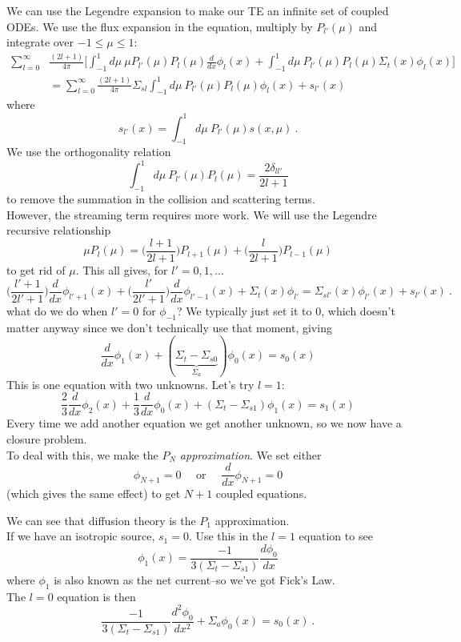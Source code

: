 \documentclass[12pt]{article}
\begin{document}
We can use the Legendre expansion to make our TE an infinite set of coupled ODEs. We use the flux expansion in the equation, multiply by $P_{l'}(\mu)$ and integrate over $-1 \leq \mu \leq 1$:
\begin{align*}
\sum_{l=0}^{\infty} &\frac{(2l+1)}{4\pi}\biggl[\int_{-1}^1 d\mu\: \mu P_{l'}(\mu) P_l(\mu) \frac{d}{d x}\phi_l(x) +  \int_{-1}^1 d\mu\: P_{l'}(\mu) P_l(\mu) \Sigma_t(x)\phi_l(x) \biggr] \\
&= \sum_{l=0}^{\infty} \frac{(2l+1)}{4\pi} \Sigma_{sl}\int_{-1}^1 d\mu\: P_{l'}(\mu) P_l(\mu) \phi_l(x) + s_{l'}(x)
\end{align*}
where
\[
s_{l'}(x) = \int_{-1}^1 d\mu\:P_{l'}(\mu) s(x,\mu)\:.
\]
We use the orthogonality relation
\[
\int_{-1}^1 d\mu\: P_{l'}(\mu) P_l(\mu) = \frac{2\delta_{l l'}}{2l+1}
\]
to remove the summation in the collision and scattering terms. \\
However, the streaming term requires more work. We will use the Legendre recursive relationship
\[
\mu P_l(\mu) = \bigl(\frac{l+1}{2l+1}\bigr)P_{l+1}(\mu) + \bigl(\frac{l}{2l+1}\bigr)P_{l-1}(\mu)
\]
to get rid of $\mu$. This all gives, for $l' = 0, 1, \dots$
\[
\bigl(\frac{l'+1}{2l'+1}\bigr)\frac{d}{d x}\phi_{l'+1}(x) + \bigl(\frac{l'}{2l'+1}\bigr)\frac{d}{d x}\phi_{l'-1}(x) + \Sigma_t(x) \phi_{l'} = \Sigma_{sl'}(x)\phi_{l'}(x) + s_{l'}(x)\:.
\]
what do we do when $l'=0$ for $\phi_{-1}$? We typically just set it to $0$, which doesn't matter anyway since we don't technically use that moment, giving
\[
\frac{d}{dx}\phi_1(x) + (\underbrace{\Sigma_t - \Sigma_{s0}}_{\Sigma_a})\phi_0(x) = s_0(x)
\]
This is one equation with two unknowns. Let's try $l=1$:
\[
\frac{2}{3}\frac{d}{dx}\phi_2(x) + \frac{1}{3}\frac{d}{dx}\phi_0(x) + (\Sigma_t - \Sigma_{s1})\phi_1(x) = s_1(x)
\]
Every time we add another equation we get another unknown, so we now have a closure problem.\\
To deal with this, we make the $P_N$ \textit{approximation}. We set either 
\[\phi_{N+1} = 0 \quad\text{ or }\quad\frac{d}{dx}\phi_{N+1}=0
\]
(which gives the same effect) to get $N+1$ coupled equations. 

We can see that diffusion theory is the $P_1$ approximation.\\
If we have an isotropic source, $s_1=0$. Use this in the $l=1$ equation to see
\[
\phi_1(x) = \frac{-1}{3(\Sigma_t - \Sigma_{s1})}\frac{d \phi_0}{dx}
\]
where $\phi_1$ is also known as the net current--so we've got Fick's Law.\\
The $l=0$ equation is then
\[
\frac{-1}{3(\Sigma_t - \Sigma_{s1})}\frac{d^2 \phi_0}{dx^2} + \Sigma_a \phi_0(x) = s_0(x)\:.
\]
\end{document}
